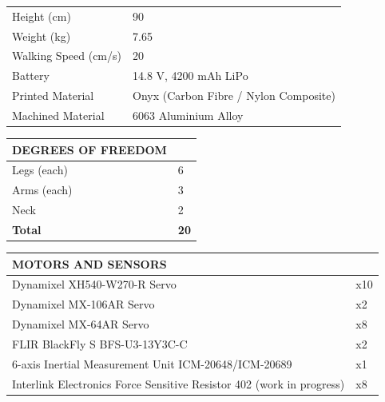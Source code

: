 \documentclass[10pt,a4paper]{article}
\begin{document}
\begin{multicols}{2}
\begin{table}[H]
	\begin{tabular}{|m{3.8cm}|m{3.35cm}|}
		\hline
		\rowcolor[rgb]{0.0, 0.0, 0.0}
		\multicolumn{2}{l}{\color{textcolour}\textbf{{PHYSICAL SPECIFICATIONS}}} \\
		\hline
		Height (cm) & 90 \\
		\hline
		Weight (kg) & 7.65 \\
		\hline
		Walking Speed (cm/s) & 20 \\
		\hline
		Battery & 14.8 V, 4200 mAh LiPo \\
		\hline
		Printed Material & Onyx (Carbon Fibre / Nylon Composite) \\
		\hline
		Machined Material & 6063 Aluminium Alloy \\
		\hline		
	\end{tabular}
\end{table}

\begin{table}[H]
	\begin{tabular}{|m{5.9cm}|m{1.25cm}|}
		\hline
		\rowcolor[rgb]{0.0, 0.0, 0.0}
		{\color{textcolour}\textbf{{DEGREES OF FREEDOM}}} & \\
		\hline
		Legs (each) & 6 \\
		\hline
		Arms (each) & 3 \\
		\hline
		Neck & 2 \\
		\hline
		\textbf{Total} & \textbf{20} \\
		\hline
	\end{tabular}
\end{table}

\begin{table}[H]
	\begin{tabular}{|m{5.9cm}|m{1.25cm}|}
		\hline
		\rowcolor[rgb]{0.0, 0.0, 0.0}
		{\color{textcolour}\textbf{{MOTORS AND SENSORS}}} & \\
		\hline
            Dynamixel XH540-W270-R Servo & x10 \\
            \hline
		Dynamixel MX-106AR Servo & x2 \\
		\hline
		Dynamixel MX-64AR Servo & x8 \\
		\hline
		FLIR BlackFly S BFS-U3-13Y3C-C & x2 \\
		\hline
            6-axis Inertial Measurement Unit ICM-20648/ICM-20689 & x1 \\
            \hline
            Interlink Electronics Force Sensitive Resistor 402 (work in progress) & x8 \\
            \hline
	\end{tabular}
\end{table}


\end{multicols}
\end{document}
